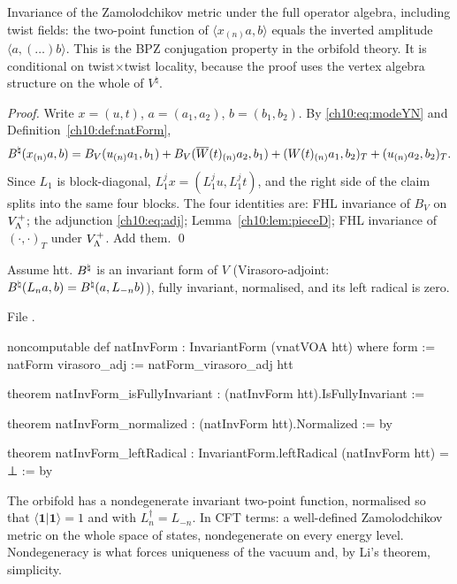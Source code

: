 \begin{physics}
Invariance of the Zamolodchikov metric under the full operator algebra, including twist fields: the two-point function of $\langle x_{(n)}a,b\rangle$ equals the inverted amplitude $\langle a,(\ldots)b\rangle$. This is the BPZ conjugation property in the orbifold theory. It is conditional on twist$\times$twist locality, because the proof uses the vertex algebra structure on the whole of $V^\natural$.
\end{physics}

\emph{Proof.}  Write $x=(u,t)$, $a=(a_1,a_2)$, $b=(b_1,b_2)$.  By \eqref{ch10:eq:modeYN} and
Definition~\ref{ch10:def:natForm},
\begin{equation*}
B^{\natural}(x_{(n)}a,b)=B_V(u_{(n)}a_1,b_1)+B_V(\overline{W}(t)_{(n)}a_2,b_1)+(W(t)_{(n)}a_1,b_2)_T+(u_{(n)}a_2,b_2)_T .
\end{equation*}
Since $L_1$ is block-diagonal, $L_1^jx=(L_1^ju,L_1^jt)$, and the right side of the claim splits
into the same four blocks.  The four identities are: FHL invariance of $B_V$ on $V_{\Lambda}^{+}$; the
adjunction \eqref{ch10:eq:adj}; Lemma~\ref{ch10:lem:pieceD}; FHL invariance of $(\cdot,\cdot)_T$ under
$V_{\Lambda}^{+}$.  Add them. \qed

\begin{theorem}\label{ch10:thm:natInvForm}
Assume htt.  $B^{\natural}$ is an invariant form of $V$ (Virasoro-adjoint: $B^{\natural}(L_na,b)=B^{\natural}(a,L_{-n}b)$),
fully invariant, normalised, and its left radical is zero.
\end{theorem}
\noindent File .
\begin{leancode}
noncomputable def natInvForm : InvariantForm (vnatVOA htt) where
  form := natForm
  virasoro_adj := natForm_virasoro_adj htt

theorem natInvForm_isFullyInvariant : (natInvForm htt).IsFullyInvariant :=

theorem natInvForm_normalized : (natInvForm htt).Normalized := by

theorem natInvForm_leftRadical : InvariantForm.leftRadical (natInvForm htt) = ⊥ := by
\end{leancode}

\begin{physics}
The orbifold has a nondegenerate invariant two-point function, normalised so that $\langle\mathbf1|\mathbf1\rangle=1$ and with $L_n^\dagger=L_{-n}$. In CFT terms: a well-defined Zamolodchikov metric on the whole space of states, nondegenerate on every energy level. Nondegeneracy is what forces uniqueness of the vacuum and, by Li's theorem, simplicity.
\end{physics}

